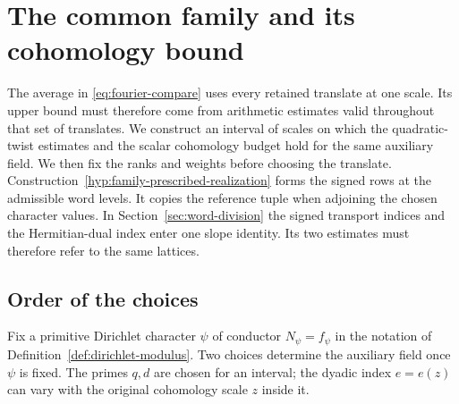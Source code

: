 \section{The common family and its cohomology bound}
\label{sec:family-window}
\hypertarget{source-family-window}{}

The average in \eqref{eq:fourier-compare} uses every retained translate at one scale. Its upper bound must therefore come from arithmetic estimates valid throughout that set of translates. We construct an interval of
scales on which the quadratic-twist estimates and the scalar
cohomology budget hold for the same auxiliary field. We then fix
the ranks and weights before choosing the translate. Construction~\ref{hyp:family-prescribed-realization} forms the signed rows at the admissible word levels. It copies the reference tuple when adjoining the chosen character values. In Section~\ref{sec:word-division} the signed transport indices and the Hermitian-dual index enter one slope identity. Its two estimates must therefore refer to the same lattices.

\subsection{Order of the choices}

Fix a primitive Dirichlet character \(\psi\) of conductor \(N_\psi=f_\psi\) in the notation of Definition~\ref{def:dirichlet-modulus}.
Two choices determine the auxiliary field once \(\psi\) is fixed. The primes \(q,d\) are chosen for an interval; the dyadic index \(e=e(z)\) can vary with the original cohomology scale \(z\) inside it.


